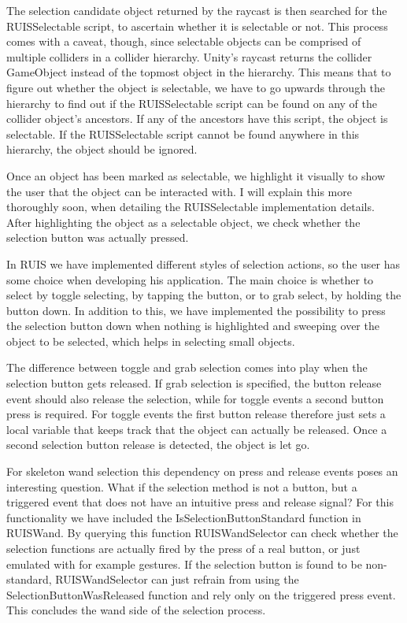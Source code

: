 \documentclass[12pt,a4paper,oneside,pdftex]{report}
\begin{document}
The selection candidate object returned by the raycast is then searched for the RUISSelectable script, to ascertain whether it is selectable or not. This process comes with a caveat, though, since selectable objects can be comprised of multiple colliders in a collider hierarchy. Unity's raycast returns the collider GameObject instead of the topmost object in the hierarchy. This means that to figure out whether the object is selectable, we have to go upwards through the hierarchy to find out if the RUISSelectable script can be found on any of the collider object's ancestors. If any of the ancestors have this script, the object is selectable. If the RUISSelectable script cannot be found anywhere in this hierarchy, the object should be ignored.

Once an object has been marked as selectable, we highlight it visually to show the user that the object can be interacted with. I will explain this more thoroughly soon, when detailing the RUISSelectable implementation details. After highlighting the object as a selectable object, we check whether the selection button was actually pressed.

In RUIS we have implemented different styles of selection actions, so the user has some choice when developing his application. The main choice is whether to select by toggle selecting, by tapping the button, or to grab select, by holding the button down. In addition to this, we have implemented the possibility to press the selection button down when nothing is highlighted and sweeping over the object to be selected, which helps in selecting small objects.

The difference between toggle and grab selection comes into play when the selection button gets released. If grab selection is specified, the button release event should also release the selection, while for toggle events a second button press is required. For toggle events the first button release therefore just sets a local variable that keeps track that the object can actually be released. Once a second selection button release is detected, the object is let go. 

For skeleton wand selection this dependency on press and release events poses an interesting question. What if the selection method is not a button, but a triggered event that does not have an intuitive press and release signal? For this functionality we have included the IsSelectionButtonStandard function in RUISWand. By querying this function RUISWandSelector can check whether the selection functions are actually fired by the press of a real button, or just emulated with for example gestures. If the selection button is found to be non-standard, RUISWandSelector can just refrain from using the SelectionButtonWasReleased function and rely only on the triggered press event. This concludes the wand side of the selection process.
\end{document}
